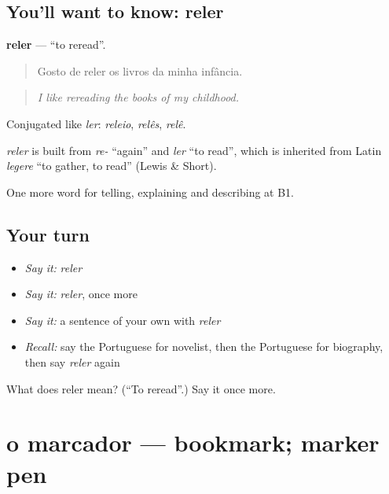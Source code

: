 \subsection*{You'll want to know: reler}
\textbf{reler} — \textquotedblleft{}to reread\textquotedblright{}.

\begin{quote}
Gosto de reler os livros da minha infância.
\end{quote}

\begin{quote}
\emph{I like rereading the books of my childhood.}
\end{quote}

Conjugated like \emph{ler}: \emph{releio}, \emph{relês}, \emph{relê}.

\begin{cousinweb}
\emph{reler} is built from \emph{re-} \textquotedblleft{}again\textquotedblright{} and \emph{ler} \textquotedblleft{}to read\textquotedblright{}, which is inherited from Latin \emph{legere} \textquotedblleft{}to gather, to read\textquotedblright{} (Lewis \& Short).
\end{cousinweb}

\begin{grammarlens}[title={What you've built}]
One more word for telling, explaining and describing at B1.
\end{grammarlens}

\subsection*{Your turn}
\begin{itemize}
\raggedright
  \item \emph{Say it:} \emph{reler}
  \item \emph{Say it:} \emph{reler}, once more
  \item \emph{Say it:} a sentence of your own with \emph{reler}
  \item \emph{Recall:} say the Portuguese for novelist, then the Portuguese for biography, then say \emph{reler} again
\end{itemize}

\begin{tcolorbox}[breakable,colback=teal!4,colframe=teal!35!black,title={Before you move on}]
What does reler mean? (\textquotedblleft{}To reread\textquotedblright{}.) Say it once more.
\end{tcolorbox}
\section[o marcador]{o marcador — bookmark; marker pen}

